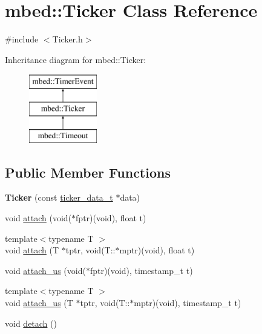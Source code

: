 \hypertarget{classmbed_1_1Ticker}{}\section{mbed\+:\+:Ticker Class Reference}
\label{classmbed_1_1Ticker}


{\ttfamily \#include $<$Ticker.\+h$>$}

Inheritance diagram for mbed\+:\+:Ticker\+:\begin{figure}[H]
\begin{center}
\leavevmode
\includegraphics[height=3.000000cm]{classmbed_1_1Ticker}
\end{center}
\end{figure}
\subsection*{Public Member Functions}
\begin{DoxyCompactItemize}
\item 
{\bfseries Ticker} (const \hyperlink{structticker__data__t}{ticker\+\_\+data\+\_\+t} $\ast$data)\hypertarget{classmbed_1_1Ticker_a631e5575d55463ac52879318adda281f}{}\label{classmbed_1_1Ticker_a631e5575d55463ac52879318adda281f}

\item 
void \hyperlink{classmbed_1_1Ticker_a1fa23f99146b5bbe90791fad6fe47d36}{attach} (void($\ast$fptr)(void), float t)
\item 
{\footnotesize template$<$typename T $>$ }\\void \hyperlink{classmbed_1_1Ticker_ab09230bc20507a3c2b57b98ca14a0aab}{attach} (T $\ast$tptr, void(T\+::$\ast$mptr)(void), float t)
\item 
void \hyperlink{classmbed_1_1Ticker_ac951d3470bbccdec8acc6b51814d0e64}{attach\+\_\+us} (void($\ast$fptr)(void), timestamp\+\_\+t t)
\item 
{\footnotesize template$<$typename T $>$ }\\void \hyperlink{classmbed_1_1Ticker_af7d2e7ff520d40a627c44f491f5a549b}{attach\+\_\+us} (T $\ast$tptr, void(T\+::$\ast$mptr)(void), timestamp\+\_\+t t)
\item 
void \hyperlink{classmbed_1_1Ticker_a07a1e3eae57ba0586ad5680f7efdb3db}{detach} ()
\end{DoxyCompactItemize}
